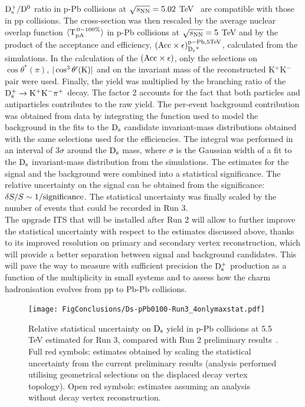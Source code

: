 ${\rm D_s^+}/{\rm D^0}$ ratio in p-Pb collisions at $\sqrt{s_{\rm NN}}=5.02$ TeV~\cite{ALICE-PUBLIC-2017-008}
are compatible with those in pp collisions.
The cross-section was then rescaled by the average nuclear overlap function 
$\langle {\rm T}_{\rm pA}^{\rm \,0-100\%}\rangle$ in p-Pb collisions at  $\sqrt{s_{\rm NN}}=5$ TeV and by the
product of the acceptance and efficiency, $({\rm Acc\times \epsilon})_{{\rm D_s}^+}^{\rm p-Pb, 5 TeV}$, 
calculated from the simulations. In the calculation of the $({\rm Acc\times \epsilon})$, only 
the selections on $\cos \theta^*(\pi)$, $|\cos^3 \theta^\prime({\rm K})|$ and on the
invariant mass of the reconstructed K$^+$K$^-$ pair were used. Finally, the yield was multiplied by the 
branching ratio of the ${\rm D^{+}_\mathrm{s}\to K^+ K^-\pi^+}$ decay. The factor 2 accounts for the fact that both particles and 
antiparticles contributes to the raw yield. The per-event background contribution was obtained from data by integrating the 
function used to model the background in the fits to the ${\rm D_s}$ candidate invariant-mass distributions
obtained with the same selections used for the efficiencies. The integral was performed in an interval of 
3$\sigma$ around the ${\rm D_s}$ mass, where $\sigma$ is the Gaussian width of a fit to the 
${\rm D_s}$ invariant-mass distribution from the simulations.
The estimates for the signal and the background
were combined into a statistical significance. The relative uncertainty on the signal can be obtained 
from the significance: $\delta S/S \sim 1/{\rm significance}$. The statistical uncertainty was finally scaled
by the number of events that could be recorded in Run 3.\\



The upgrade ITS that will be installed after Run 2 will allow to further improve the statistical uncertainty with respect to 
the estimates discussed above, thanks to its improved resolution on primary and secondary vertex reconstruction,
which will provide a better separation between signal and background candidates.
This will pave the way to measure with sufficient precision the ${\rm D_s^+}$ production as a function of the multiplicity
in small systems and to assess how the charm hadronisation evolves from pp to Pb-Pb collisions.

\begin{figure}[h]
\centering
 \texttt{[image: FigConclusions/Ds-pPb0100-Run3\_4onlymaxstat.pdf]}
 \caption{Relative statistical uncertainty on ${\rm D_s}$ yield in p-Pb collisions at 5.5 TeV estimated for Run 3, compared with Run 2 preliminary results~\cite{ALICE-PUBLIC-2017-008}. Full red symbols: estimates obtained by scaling the statistical uncertainty from the current preliminary results 
 (analysis performed utilising geometrical selections on the displaced decay vertex topology). Open red symbols: estimates assuming an analysis without decay vertex reconstruction.}
 \label{fig:DsEstimatespPb}
\end{figure}




